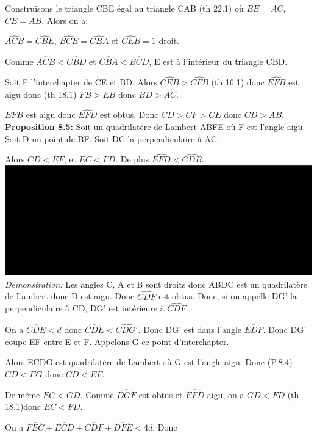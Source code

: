 \documentclass[a4paper, 12pt, twoside]{book}
\begin{document}
   
    Construisons le triangle CBE égal au triangle CAB (th 22.1) où $BE=AC$, $CE=AB$. Alors on a:\
  
 $\hat{ACB}= \hat{CBE}$, $\hat{BCE}= \hat{CBA}$ et $\hat{CEB}= 1$ droit.\
 
 Comme   $ \hat{ACB}< \hat{CBD}$ et $\hat{CBA}< \hat{BCD}$, E est à l'intérieur du triangle CBD.\
 
 Soit F l'interchapter de CE et BD. Alors $\hat{CEB}>\hat{CFB}$ (th 16.1) donc $\hat{EFB}$ est aigu donc (th 18.1) $FB>EB$ donc $BD>AC$.\
 
 $\hat{EFB}$ est aigu donc $\hat{EFD}$ est obtus. Donc $CD>CF>CE$ donc $CD>AB$.\\
 
 
 \textbf{Proposition 8.5:} Soit un quadrilatère de Lambert ABFE où F est l'angle aigu. Soit D un point de BF. Soit DC la perpendiculaire à AC.\
 
  Alors $CD<EF$, et $EC<FD$. De plus $\hat{EFD}<\hat{CDB}$.\\
  
 
   
 
  \includegraphics[scale=0.4]{figures/Lambert4.eps} \\
 
    
  \textit{Démonstration:} Les angles C, A et B sont droits donc ABDC est un quadrilatère de Lambert donc D est aigu. Donc $\hat{CDF}$ est obtus. Donc, si on appelle DG' la perpendiculaire à CD, DG' est intérieure à  $\hat{CDF}$.\
   
   On a $\hat{CDE}<d$  donc $\hat{CDE}<\hat{CDG'}$. Donc DG' est dans l'angle $\hat{EDF}$. Donc DG' coupe EF entre E et F. Appelons G ce point d'interchapter.\
   
   Alors ECDG est quadrilatère de Lambert où G est l'angle aigu. Donc (P.8.4) $CD<EG$ donc $CD<EF$.\
   
   De même $EC<GD$. Comme $\hat{DGF}$ est obtus et $\hat{EFD}$ aigu, on a $GD<FD$ (th 18.1)donc $EC<FD$.\
   
   On a  $\hat{FEC}+\hat{ECD}+\hat{CDF}+\hat{DFE}<4d$. Donc\
   
\end{document}
